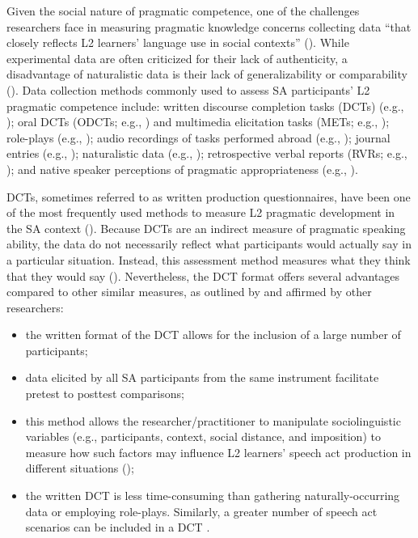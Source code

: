 \documentclass[output=paper]{langscibook}
\begin{document}
 Given the social nature of pragmatic competence, one of the challenges re\-search\-ers face in measuring pragmatic knowledge concerns collecting data “that closely reflects L2 learners’ language use in social contexts” (\citealt[7]{Taguchi2018}). While experimental data are often criticized for their lack of authenticity, a disadvantage of naturalistic data is their lack of generalizability or comparability (\citealt{Taguchi2018,TaguchiRoever2017}). Data collection methods commonly used to assess SA participants’ L2 pragmatic competence include: written discourse completion tasks (DCTs) (e.g., \citealt{CohenShively2007,Hernández2016,Hernández2018a,HernándezBoero2018a,ShivelyCohen2008}); oral DCTs (ODCTs; e.g., \citealt{Félix-BrasdeferHasler-Barker2015,Halenko2018,Hernándezinpress,TaguchiLi2016}) and multimedia elicitation tasks (METs; e.g., \citealt{Schauer2004}); role-plays (e.g., \citealt{Bataller2010,Hernández2018b,Woodfield2012}); audio recordings of tasks performed abroad (e.g., \citealt{HernándezBoero2018a,Morris2017}); journal entries (e.g., \citealt{Dufon1999,Hernández2018b,Shively2011}); naturalistic data (e.g., \citealt{Dufon1999,Shively2011,Shively2015,Shively2015});  retrospective verbal reports (RVRs; e.g., \citealt{Hernández2018a,Ren2014,Woodfield2012}); and native speaker perceptions of pragmatic appropriateness (e.g., \citealt{CohenShively2007,Hernández2016,Hernández2018a,Hernándezinpress,HernándezBoero2018a,Li2014,ShivelyCohen2008,Taguchi2011}).

 DCTs, sometimes referred to as written production questionnaires, have been one of the most frequently used methods to measure L2 pragmatic development in the SA context (\citealt{Félix-Brasdefer2010,Taguchi2018}). Because DCTs are an indirect measure of pragmatic speaking ability, the data do not necessarily reflect what participants would actually say in a particular situation. Instead, this assessment method measures what they think that they would say (\citealt{Golato2003,ShivelyCohen2008}). Nevertheless, the DCT format offers several advantages compared to other similar measures, as outlined by \citet{ShivelyCohen2008} and affirmed by other researchers:

\begin{itemize}
\item the written format of the DCT allows for the inclusion of a large number of participants;
\item data elicited by all SA participants from the same instrument facilitate pretest to posttest comparisons;
\item this method allows the researcher/practitioner to manipulate sociolinguistic variables (e.g., participants, context, social distance, and imposition) to measure how such factors may influence L2 learners’ speech act production in different situations (\citealt{KasperRose2002,Taguchi2018,TaguchiRoever2017});
\item the written DCT is less time-consuming than gathering naturally-oc\-curr\-ing data or employing role-plays. Similarly, a greater number of speech act scenarios can be included in a DCT \citep{Taguchi2018}.
\end{itemize}
\end{document}
